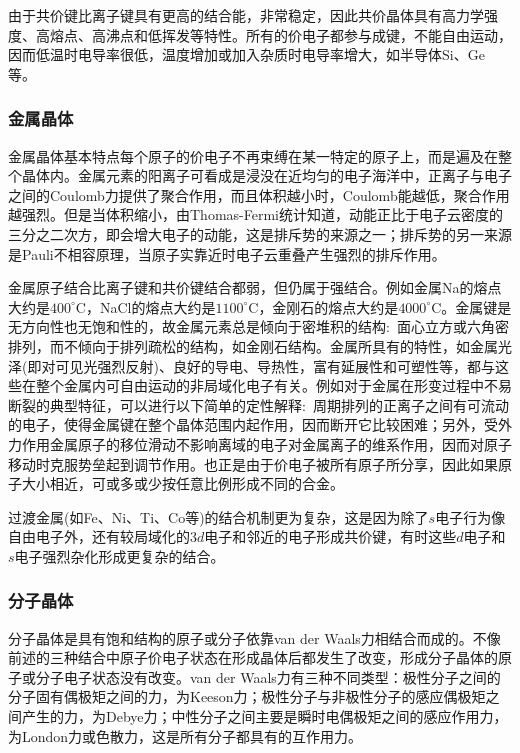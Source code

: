 由于共价键比离子键具有更高的结合能，非常稳定，因此共价晶体具有高力学强度、高熔点、高沸点和低挥发等特性。所有的价电子都参与成键，不能自由运动，因而低温时电导率很低，温度增加或加入杂质时电导率增大，如半导体Si、Ge等。

\subsubsection{金属晶体}
金属晶体基本特点每个原子的价电子不再束缚在某一特定的原子上，而是遍及在整个晶体内。金属元素的阳离子可看成是浸没在近均匀的电子海洋中，正离子与电子之间的Coulomb力提供了聚合作用，而且体积越小时，Coulomb能越低，聚合作用越强烈。但是当体积缩小，由Thomas-Fermi统计知道，动能正比于电子云密度的三分之二次方，即会增大电子的动能，这是排斥势的来源之一；排斥势的另一来源是Pauli不相容原理，当原子实靠近时电子云重叠产生强烈的排斥作用。

金属原子结合比离子键和共价键结合都弱，但仍属于强结合。例如金属Na的熔点大约是$400^{\circ}\mathrm{C}$，NaCl的熔点大约是$1100^{\circ}\mathrm{C}$，金刚石的熔点大约是$4000^{\circ}\mathrm{C}$。金属键是无方向性也无饱和性的，故金属元素总是倾向于密堆积的结构:~面心立方或六角密排列，而不倾向于排列疏松的结构，如金刚石结构。金属所具有的特性，如金属光泽(即对可见光强烈反射)、良好的导电、导热性，富有延展性和可塑性等，都与这些在整个金属内可自由运动的非局域化电子有关。例如对于金属在形变过程中不易断裂的典型特征，可以进行以下简单的定性解释:~周期排列的正离子之间有可流动的电子，使得金属键在整个晶体范围内起作用，因而断开它比较困难；另外，受外力作用金属原子的移位滑动不影响离域的电子对金属离子的维系作用，因而对原子移动时克服势垒起到调节作用。也正是由于价电子被所有原子所分享，因此如果原子大小相近，可或多或少按任意比例形成不同的合金。

过渡金属(如Fe、Ni、Ti、Co等)的结合机制更为复杂，这是因为除了$s$电子行为像自由电子外，还有较局域化的$3d$电子和邻近的电子形成共价键，有时这些$d$电子和$s$电子强烈杂化形成更复杂的结合。

\subsubsection{分子晶体} 
分子晶体是具有饱和结构的原子或分子依靠van der Waals力相结合而成的。不像前述的三种结合中原子价电子状态在形成晶体后都发生了改变，形成分子晶体的原子或分子电子状态没有改变。van der Waals力有三种不同类型：极性分子之间的分子固有偶极矩之间的力，为Keeson力；极性分子与非极性分子的感应偶极矩之间产生的力，为Debye力；中性分子之间主要是瞬时电偶极矩之间的感应作用力，为London力或色散力，这是所有分子都具有的互作用力。

